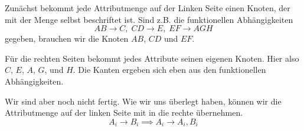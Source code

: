 \documentclass[a4paper, ngerman]{article}
\begin{document}
Zunächst bekommt jede Attributmenge
auf der Linken Seite einen Knoten,
der mit der Menge selbst beschriftet ist.
Sind z.B. die funktionellen Abhängigkeiten
$$
    AB \to C,\;
    CD \to E,\;
    EF \to AGH
$$
gegeben, brauchen wir die Knoten $AB$, $CD$ und $EF$.
\begin{center}
\end{center}
Für die rechten Seiten bekommt
jedes Attribute seinen eigenen Knoten.
Hier also $C$, $E$, $A$, $G$, und $H$.
Die Kanten ergeben sich eben aus
den funktionellen Abhängigkeiten.
\begin{center}
\end{center}
Wir sind aber noch nicht fertig.
Wie wir uns überlegt haben,
können wir die Attributmenge
auf der linken Seite mit in die rechte übernehmen.
$$
    A_i \to B_i \implies
    A_i \to A_i, B_i 
$$
\end{document}
